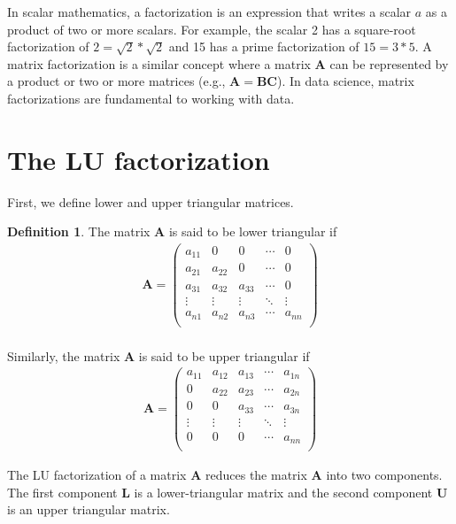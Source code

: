 \documentclass[
]{book}
\theoremstyle{definition}
\newtheorem{definition}{Definition}[chapter]
\theoremstyle{definition}
\theoremstyle{definition}
\theoremstyle{definition}
\theoremstyle{remark}
\begin{document}
In scalar mathematics, a factorization is an expression that writes a scalar \(a\) as a product of two or more scalars. For example, the scalar 2 has a square-root factorization of \(2 =\sqrt{2} * \sqrt{2}\) and 15 has a prime factorization of \(15 = 3 * 5\). A matrix factorization is a similar concept where a matrix \(\mathbf{A}\) can be represented by a product or two or more matrices (e.g., \(\mathbf{A} = \mathbf{B} \mathbf{C}\)). In data science, matrix factorizations are fundamental to working with data.

\hypertarget{the-lu-factorization}{%
\section{The LU factorization}\label{the-lu-factorization}}

First, we define lower and upper triangular matrices.

\begin{definition}
The matrix \(\mathbf{A}\) is said to be lower triangular if
\[
\begin{aligned}
\mathbf{A} = \begin{pmatrix} 
a_{11} & 0 & 0 & \cdots & 0 \\
a_{21} & a_{22} & 0 & \cdots & 0 \\
a_{31} & a_{32} & a_{33} & \cdots & 0 \\
\vdots & \vdots & \vdots & \ddots & \vdots \\
a_{n1} & a_{n2} & a_{n3} & \cdots & a_{nn} \\
\end{pmatrix}
\end{aligned}
\]\\
Similarly, the matrix \(\mathbf{A}\) is said to be upper triangular if
\[
\begin{aligned}
\mathbf{A} = \begin{pmatrix} 
a_{11} & a_{12} & a_{13} & \cdots & a_{1n} \\
0 & a_{22} & a_{23} & \cdots & a_{2n} \\
0 & 0 & a_{33} & \cdots & a_{3n} \\
\vdots & \vdots & \vdots & \ddots & \vdots \\
0 & 0 & 0 & \cdots & a_{nn} \\
\end{pmatrix}
\end{aligned}
\]
\end{definition}

The LU factorization of a matrix \(\mathbf{A}\) reduces the matrix \(\mathbf{A}\) into two components. The first component \(\mathbf{L}\) is a lower-triangular matrix and the second component \(\mathbf{U}\) is an upper triangular matrix.
\end{document}
